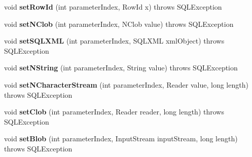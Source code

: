 \begin{DoxyCompactItemize}
void {\bfseries set\+Row\+Id} (int parameter\+Index, Row\+Id x)  throws S\+Q\+L\+Exception 
\item 
\mbox{\label{classcom_1_1mysql_1_1jdbc_1_1jdbc2_1_1optional_1_1_j_d_b_c4_prepared_statement_wrapper_a3ff0b2d68dcaa6fe80b8f294aca12052}} 
void {\bfseries set\+N\+Clob} (int parameter\+Index, N\+Clob value)  throws S\+Q\+L\+Exception 
\item 
\mbox{\label{classcom_1_1mysql_1_1jdbc_1_1jdbc2_1_1optional_1_1_j_d_b_c4_prepared_statement_wrapper_aa48fe1b998dca7eec8ff55b31b539a28}} 
void {\bfseries set\+S\+Q\+L\+X\+ML} (int parameter\+Index, S\+Q\+L\+X\+ML xml\+Object)  throws S\+Q\+L\+Exception 
\item 
\mbox{\label{classcom_1_1mysql_1_1jdbc_1_1jdbc2_1_1optional_1_1_j_d_b_c4_prepared_statement_wrapper_af572b20cfaceef2f9a8c612eaa3f4c79}} 
void {\bfseries set\+N\+String} (int parameter\+Index, String value)  throws S\+Q\+L\+Exception 
\item 
\mbox{\label{classcom_1_1mysql_1_1jdbc_1_1jdbc2_1_1optional_1_1_j_d_b_c4_prepared_statement_wrapper_a4552396a83cd5f0586e76e890fadf67b}} 
void {\bfseries set\+N\+Character\+Stream} (int parameter\+Index, Reader value, long length)  throws S\+Q\+L\+Exception 
\item 
\mbox{\label{classcom_1_1mysql_1_1jdbc_1_1jdbc2_1_1optional_1_1_j_d_b_c4_prepared_statement_wrapper_a1d9da6e70bf5444bcd95c9f8fb91936b}} 
void {\bfseries set\+Clob} (int parameter\+Index, Reader reader, long length)  throws S\+Q\+L\+Exception 
\item 
\mbox{\label{classcom_1_1mysql_1_1jdbc_1_1jdbc2_1_1optional_1_1_j_d_b_c4_prepared_statement_wrapper_a37ff9eead04fb60da0eb0757d227d6fa}} 
void {\bfseries set\+Blob} (int parameter\+Index, Input\+Stream input\+Stream, long length)  throws S\+Q\+L\+Exception 

\end{DoxyCompactItemize}
